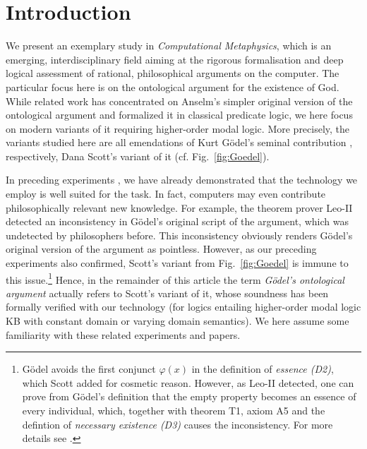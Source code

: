 \documentclass{birkjour}
\theoremstyle{definition}
\theoremstyle{remark}
\numberwithin{equation}{section}
\begin{document}
\section{Introduction}
We present an exemplary study in \emph{Computational Metaphysics},
which is an emerging, interdisciplinary field aiming at the rigorous
formalisation and deep logical assessment of rational, philosophical
arguments on the computer.  The particular focus here is on the
ontological argument for the existence of God.  While related work
\citep{oppenheimer11,rushby13} has concentrated on Anselm's simpler original
version of the ontological argument and formalized it in classical
predicate logic, we here focus on modern variants of it requiring
higher-order modal logic. More precisely, the variants studied here are
all emendations of Kurt Gödel's seminal contribution
\citep{GoedelNotes}, respectively, Dana Scott's variant of it
\cite{ScottNotes} (cf. Fig.~\ref{fig:Goedel}). 

In preceding experiments \citep{C55,C40,J30}, we have already
demonstrated that the technology we employ is well suited for the
task. In fact, computers may even contribute philosophically relevant
new knowledge. For example, the theorem prover Leo-II \cite{Leo-II}
detected an inconsistency in Gödel's original script
\citep{GoedelNotes} of the argument, which was undetected by
philosophers before.  This inconsistency obviously renders Gödel's
original version of the argument as pointless.  However, as our
preceding experiments also confirmed, Scott's variant
\citep{ScottNotes} from Fig.~\ref{fig:Goedel} is immune to this
issue.\footnote{Gödel avoids the first conjunct $\varphi(x)$ in the
  definition of \emph{essence (D2)}, which Scott added for cosmetic
  reason. However, as Leo-II detected, one can prove from Gödel's
  definition that the empty property becomes an essence of every
  individual, which, together with theorem T1, axiom A5 and the
  defintion of \emph{necessary existence (D3)} causes the
  inconsistency. For more details see \citet{C55}.} Hence, in the
remainder of this article the term \emph{Gödel's ontological argument}
actually refers to Scott's variant of it, whose soundness has been
formally 
verified with our technology (for logics entailing higher-order modal
logic KB with constant domain or varying domain semantics). We here
assume some familiarity with these related experiments and papers.
\end{document}
